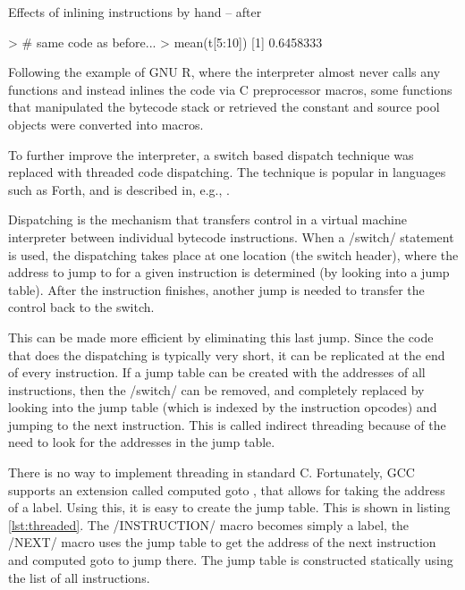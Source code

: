 \begin{listing}[htbp]
  \caption{\label{lst:after-inline}Effects of inlining instructions by hand -- after}
  \begin{rcode}
> # same code as before...
> mean(t[5:10])
[1] 0.6458333
  \end{rcode}
\end{listing}

Following the example of GNU R, where the interpreter almost never calls any functions and instead inlines the code via C preprocessor macros, some functions that manipulated the bytecode stack or retrieved the constant and source pool objects were converted into macros.

To further improve the interpreter, a switch based dispatch technique was replaced with threaded code dispatching. The technique is popular in languages such as Forth, and is described in, e.g., \autocite{threading}.

Dispatching is the mechanism that transfers control in a virtual machine interpreter between individual bytecode instructions. When a \cinline/switch/ statement is used, the dispatching takes place at one location (the switch header), where the address to jump to for a given instruction is determined (by looking into a jump table). After the instruction finishes, another jump is needed to transfer the control back to the switch.

This can be made more efficient by eliminating this last jump. Since the code that does the dispatching is typically very short, it can be replicated at the end of every instruction. If a jump table can be created with the addresses of all instructions, then the \cinline/switch/ can be removed, and completely replaced by looking into the jump table (which is indexed by the instruction opcodes) and jumping to the next instruction. This is called indirect threading because of the need to look for the addresses in the jump table.

There is no way to implement threading in standard C. Fortunately, GCC supports an extension called computed goto \autocite{gcc-computed-goto}, that allows for taking the address of a label. Using this, it is easy to create the jump table. This is shown in listing \ref{lst:threaded}. The \cinline/INSTRUCTION/ macro becomes simply a label, the \cinline/NEXT/ macro uses the jump table to get the address of the next instruction and computed goto to jump there. The jump table is constructed statically using the list of all instructions.

